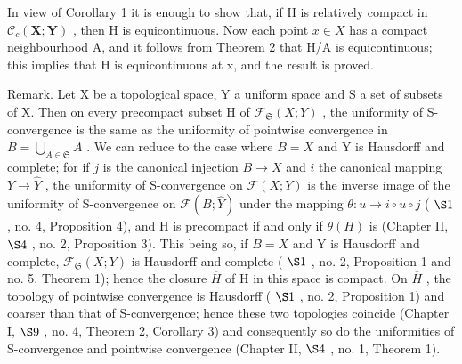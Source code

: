 In view of Corollary 1 it is enough to show that, if H is relatively compact in \(\mathcal{C}_{c}(\mathbf{X};\mathbf{Y})\) , then H is equicontinuous. Now each point \(x\in X\) has a compact neighbourhood A, and it follows from Theorem 2 that H/A is equicontinuous; this implies that H is equicontinuous at x, and the result is proved.

Remark. Let X be a topological space, Y a uniform space and S a set of subsets of X. Then on every precompact subset H of \(\mathcal{F}_{\mathfrak{S}}(X;Y)\) , the uniformity of S-convergence is the same as the uniformity of pointwise convergence in \(B = \bigcup_{A \in \mathfrak{S}} A\) . We can reduce to the case where \(B = X\) and Y is Hausdorff and complete; for if \(j\) is the canonical injection \(B \to X\) and \(i\) the canonical mapping \(Y \to \hat{Y}\) , the uniformity of S-convergence on \(\mathcal{F}(X;Y)\) is the inverse image of the uniformity of S-convergence on \(\mathcal{F}(B;\hat{Y})\) under the mapping \(\theta : u \to i \circ u \circ j\) ( \(\S 1\) , no. 4, Proposition 4), and H is precompact if and only if \(\theta(H)\) is (Chapter II, \(\S 4\) , no. 2, Proposition 3). This being so, if \(B = X\) and Y is Hausdorff and complete, \(\mathcal{F}_{\mathfrak{S}}(X;Y)\) is Hausdorff and complete ( \(\S 1\) , no. 2, Proposition 1 and no. 5, Theorem 1); hence the closure \(\overline{H}\) of H in this space is compact. On \(\overline{H}\) , the topology of pointwise convergence is Hausdorff ( \(\S 1\) , no. 2, Proposition 1) and coarser than that of S-convergence; hence these two topologies coincide (Chapter I, \(\S 9\) , no. 4, Theorem 2, Corollary 3) and consequently so do the uniformities of S-convergence and pointwise convergence (Chapter II, \(\S 4\) , no. 1, Theorem 1).

